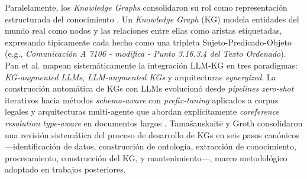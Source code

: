 \documentclass[12pt,a4paper]{article}
\begin{document}
Paralelamente, los \textit{Knowledge Graphs} consolidaron su rol como representación estructurada del conocimiento \cite{hogan2021knowledge}. Un \textit{Knowledge Graph} (KG) modela entidades del mundo real como nodos y las relaciones entre ellas como aristas etiquetadas, expresando típicamente cada hecho como una tripleta Sujeto-Predicado-Objeto (e.g., \textit{Comunicación A 7106 - modifica - Punto 3.16.3.4 del Texto Ordenado}). Pan et al. \cite{pan2024unifying} mapean sistemáticamente la integración LLM-KG en tres paradigmas: \textit{KG-augmented LLMs}, \textit{LLM-augmented KGs} y arquitecturas \textit{synergized}. La construcción automática de KGs con LLMs evolucionó desde \textit{pipelines} \textit{zero-shot} iterativos \cite{carta2023iterative} hacia métodos \textit{schema-aware} con \textit{prefix-tuning} aplicados a corpus legales \cite{li2024jkem} y arquitecturas multi-agente que abordan explícitamente \textit{coreference resolution} \textit{type-aware} en documentos largos \cite{meher2025corekg, meher2025linkkg}. Tamašauskaitė y Groth \cite{tamasauskaite2023defining} consolidaron una revisión sistemática del proceso de desarrollo de KGs en seis pasos canónicos —identificación de datos, construcción de ontología, extracción de conocimiento, procesamiento, construcción del KG, y mantenimiento—, marco metodológico adoptado en trabajos posteriores.
 
\end{document}
